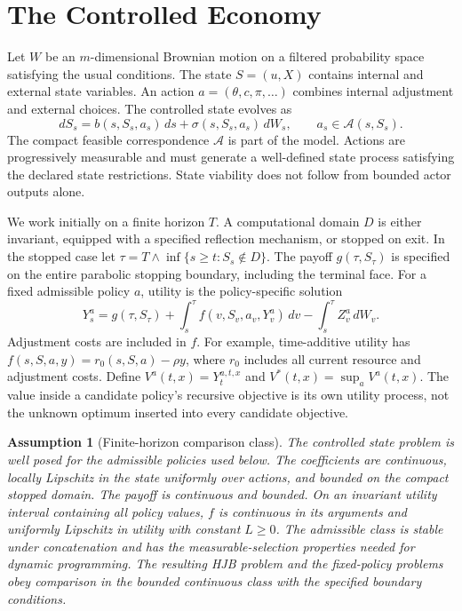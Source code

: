 \documentclass[ecta,draft]{econsocart}
\newtheorem{assumption}{Assumption}
\theoremstyle{definition}
\theoremstyle{remark}
\newcommand{\Act}{\mathcal A}
\begin{document}
\section{The Controlled Economy}\label{sec:model}
Let $W$ be an $m$-dimensional Brownian motion on a filtered probability space satisfying the usual conditions. The state $S=(u,X)$ contains internal and external state variables. An action $a=(\theta,c,\pi,\ldots)$ combines internal adjustment and external choices. The controlled state evolves as
\begin{equation}\label{eq:state}
 dS_s=b(s,S_s,a_s)\,ds+\sigma(s,S_s,a_s)\,dW_s,
 \qquad a_s\in\Act(s,S_s).
\end{equation}
The compact feasible correspondence $\Act$ is part of the model. Actions are progressively measurable and must generate a well-defined state process satisfying the declared state restrictions. State viability does not follow from bounded actor outputs alone.

We work initially on a finite horizon $T$. A computational domain $D$ is either invariant, equipped with a specified reflection mechanism, or stopped on exit. In the stopped case let $\tau=T\wedge\inf\{s\geq t:S_s\notin D\}$. The payoff $g(\tau,S_\tau)$ is specified on the entire parabolic stopping boundary, including the terminal face. For a fixed admissible policy $a$, utility is the policy-specific solution
\begin{equation}\label{eq:bsde}
 Y_s^a=g(\tau,S_\tau)+\int_s^\tau f(v,S_v,a_v,Y_v^a)\,dv
                    -\int_s^\tau Z_v^a\,dW_v.
\end{equation}
Adjustment costs are included in $f$. For example, time-additive utility has $f(s,S,a,y)=r_0(s,S,a)-\rho y$, where $r_0$ includes all current resource and adjustment costs. Define $V^a(t,x)=Y_t^{a,t,x}$ and $V^*(t,x)=\sup_a V^a(t,x)$. The value inside a candidate policy's recursive objective is its own utility process, not the unknown optimum inserted into every candidate objective.

\begin{assumption}[Finite-horizon comparison class]\label{ass:model}
The controlled state problem is well posed for the admissible policies used below. The coefficients are continuous, locally Lipschitz in the state uniformly over actions, and bounded on the compact stopped domain. The payoff is continuous and bounded. On an invariant utility interval containing all policy values, $f$ is continuous in its arguments and uniformly Lipschitz in utility with constant $L\geq0$. The admissible class is stable under concatenation and has the measurable-selection properties needed for dynamic programming. The resulting HJB problem and the fixed-policy problems obey comparison in the bounded continuous class with the specified boundary conditions.
\end{assumption}
\end{document}
